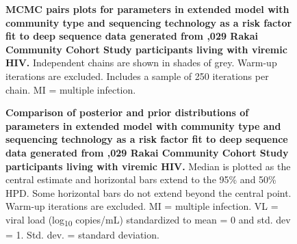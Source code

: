 \documentclass[10pt,letterpaper]{article}
\begin{document}
\begin{figure}[!ht]
\caption{{\bf MCMC pairs plots for parameters in extended model with community type and sequencing technology as a risk factor fit to deep sequence data generated from ,029 Rakai Community Cohort Study participants living with viremic HIV.} Independent chains are shown in shades of grey. Warm-up iterations are excluded. Includes a sample of 250 iterations per chain. MI = multiple infection. }
\end{figure}

\begin{figure}[!ht]
\caption{{\bf Comparison of posterior and prior distributions of parameters in extended model with community type and sequencing technology as a risk factor fit to deep sequence data generated from ,029 Rakai Community Cohort Study participants living with viremic HIV.} Median is plotted as the central estimate and horizontal bars extend to the 95\% and 50\% HPD. Some horizontal bars do not extend beyond the central point. Warm-up iterations are excluded. MI = multiple infection. VL = viral load (log\textsubscript{10} copies/mL) standardized to mean = 0 and std. dev = 1. Std. dev. = standard deviation. }
\end{figure}
\end{document}
